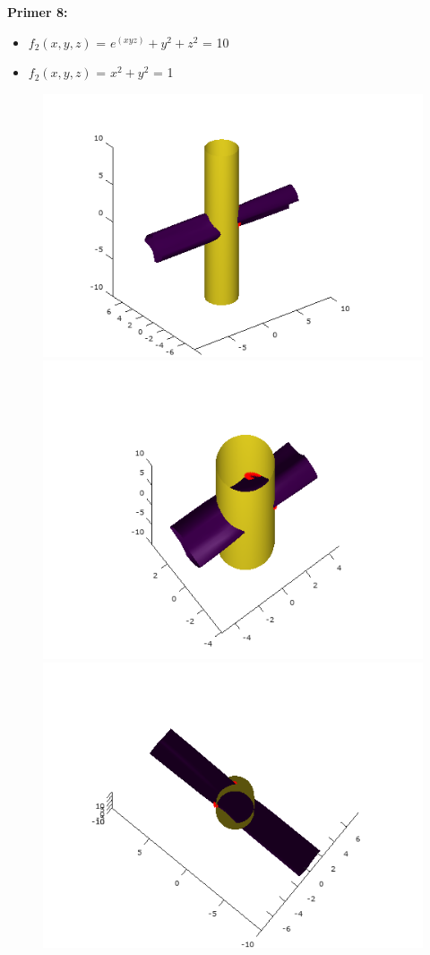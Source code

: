 \documentclass[12pt]{article}
\begin{document}
	\begin{minipage}{\textwidth}
		\textbf{\large{Primer 8:}}
		\begin{itemize}  
			\item $f_{2}(x,y,z)$ = $e^{(xyz)}+y^{2}+z^{2}$ = 10
			\item $f_{2}(x,y,z)$ =  $x^2 + y^2$ = 1
		\end{itemize}
		\begin{figure}[H]
			\centering
			\includegraphics[scale=0.5]{primer8_1}
			\includegraphics[scale=0.5]{primer8_2}
			\includegraphics[scale=0.5]{primer8_3}

\end{figure}
\end{minipage}
\end{document}
